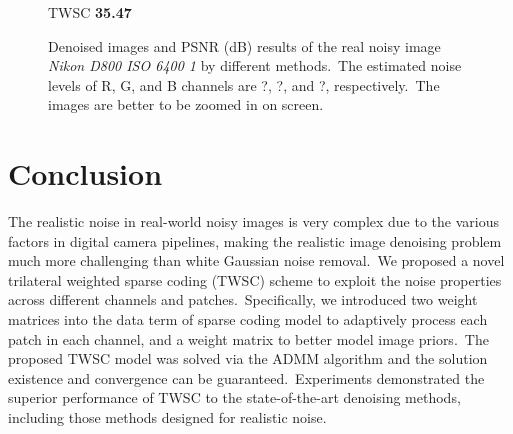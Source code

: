 \begin{figure}
{\begin{minipage}[t]{0.19\textwidth}
{\footnotesize TWSC \textbf{35.47}}
\end{minipage}
}
    \caption{Denoised images and PSNR (dB) results of the real noisy image \textsl{Nikon D800 ISO 6400 1} \cite{crosschannel2016} by different methods.\ The estimated noise levels of R, G, and B channels are ?, ?, and ?, respectively.\ The images are better to be zoomed in on screen.}
    \label{fig5-15}
\end{figure}



\section{Conclusion}

The realistic noise in real-world noisy images is very complex due to the various factors in digital camera pipelines, making the realistic image denoising problem much more challenging than white Gaussian noise removal.\ We proposed a novel trilateral weighted sparse coding (TWSC) scheme to exploit the noise properties across different channels and patches.\ Specifically, we introduced two weight matrices into the data term of sparse coding model to adaptively process each patch in each channel, and a weight matrix to better model image priors.\ The proposed TWSC model was solved via the ADMM algorithm and the solution existence and convergence can be guaranteed.\ Experiments demonstrated the superior performance of TWSC to the state-of-the-art denoising methods, including those methods designed for realistic noise.